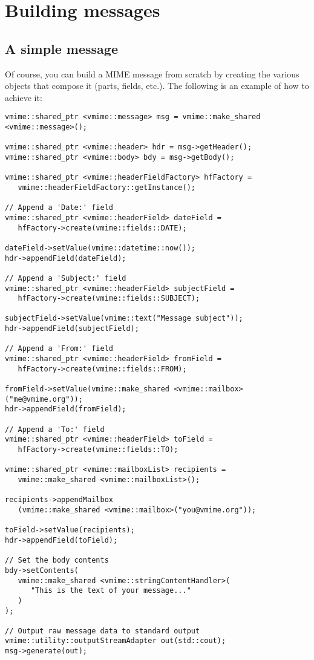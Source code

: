 \section{Building messages}

\subsection{A simple message\label{msg-building-simple-message}} %

Of course, you can build a MIME message from scratch by creating the various
objects that compose it (parts, fields, etc.). The following is an example of
how to achieve it:

\begin{lstlisting}[caption={Building a simple message from scratch}]
vmime::shared_ptr <vmime::message> msg = vmime::make_shared <vmime::message>();

vmime::shared_ptr <vmime::header> hdr = msg->getHeader();
vmime::shared_ptr <vmime::body> bdy = msg->getBody();

vmime::shared_ptr <vmime::headerFieldFactory> hfFactory =
   vmime::headerFieldFactory::getInstance();

// Append a 'Date:' field
vmime::shared_ptr <vmime::headerField> dateField =
   hfFactory->create(vmime::fields::DATE);

dateField->setValue(vmime::datetime::now());
hdr->appendField(dateField);

// Append a 'Subject:' field
vmime::shared_ptr <vmime::headerField> subjectField =
   hfFactory->create(vmime::fields::SUBJECT);

subjectField->setValue(vmime::text("Message subject"));
hdr->appendField(subjectField);

// Append a 'From:' field
vmime::shared_ptr <vmime::headerField> fromField =
   hfFactory->create(vmime::fields::FROM);

fromField->setValue(vmime::make_shared <vmime::mailbox>("me@vmime.org"));
hdr->appendField(fromField);

// Append a 'To:' field
vmime::shared_ptr <vmime::headerField> toField =
   hfFactory->create(vmime::fields::TO);

vmime::shared_ptr <vmime::mailboxList> recipients =
   vmime::make_shared <vmime::mailboxList>();

recipients->appendMailbox
   (vmime::make_shared <vmime::mailbox>("you@vmime.org"));

toField->setValue(recipients);
hdr->appendField(toField);

// Set the body contents
bdy->setContents(
   vmime::make_shared <vmime::stringContentHandler>(
      "This is the text of your message..."
   )
);

// Output raw message data to standard output
vmime::utility::outputStreamAdapter out(std::cout);
msg->generate(out);
\end{lstlisting}

